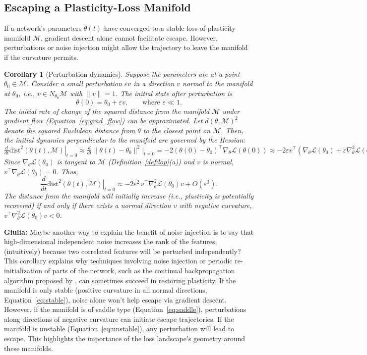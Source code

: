 \documentclass{article}
\newcommand{\Loss}{\mathcal{L}}
\newcommand{\giulia}[1]{{\color{ForestGreen}\textbf{Giulia:} #1}}
\newtheorem{corollary}{Corollary}[section]
\begin{document}
\subsection{Escaping a Plasticity-Loss Manifold}

If a network's parameters $\theta(t)$ have converged to a stable loss-of-plasticity manifold $\mathcal{M}$, gradient descent alone cannot facilitate escape. However, perturbations or noise injection might allow the trajectory to leave the manifold if the curvature permits.

\begin{corollary}[Perturbation dynamics]
\label{cor:perturb}
Suppose the parameters are at a point $\theta_0 \in \mathcal{M}$. Consider a small perturbation $\varepsilon v$ in a direction $v$ normal to the manifold at $\theta_0$, i.e., $v \in N_{\theta_0}\mathcal{M}$ with $\|v\|=1$. The initial state after perturbation is
\[
\theta(0)=\theta_0+\varepsilon v,\qquad \text{where } \varepsilon \ll 1.
\]
The initial rate of change of the squared distance from the manifold $\mathcal{M}$ under gradient flow (Equation~\ref{eq:grad_flow}) can be approximated. Let $d(\theta, \mathcal{M})^2$ denote the squared Euclidean distance from $\theta$ to the closest point on $\mathcal{M}$. Then, the initial dynamics perpendicular to the manifold are governed by the Hessian:
\(
\frac{d}{dt}\left.\mathrm{dist}^2(\theta(t),\mathcal{M})\right|_{t=0} \approx \frac{d}{dt} \|\theta(t) - \theta_0\|^2 \Big|_{t=0} = -2 (\theta(0)-\theta_0)^\top \nabla_\theta \Loss(\theta(0)) \approx -2 \varepsilon v^\top (\nabla_\theta \Loss(\theta_0) + \varepsilon \nabla_\theta^2 \Loss(\theta_0) v)
\)
Since $\nabla_\theta \Loss(\theta_0)$ is tangent to $\mathcal{M}$ (Definition~\ref{def:lop}(a)) and $v$ is normal, $v^\top \nabla_\theta \Loss(\theta_0) = 0$. Thus,
\[
\frac{d}{dt}\left.\mathrm{dist}^2(\theta(t),\mathcal{M})\right|_{t=0} \approx -2\varepsilon^2\,v^\top\nabla_\theta^2\Loss(\theta_0)v + O(\varepsilon^3).
\]
The distance from the manifold will initially increase (i.e., plasticity is potentially recovered) if and only if there exists a normal direction $v$ with negative curvature, $v^\top\nabla_\theta^2\Loss(\theta_0)v < 0$.
\end{corollary}

\giulia{Maybe another way to explain the benefit of noise injection is to say that high-dimensional independent noise increases the rank of the features, (intuitively) because two correlated features will be perturbed independently?}
This corollary explains why techniques involving noise injection or periodic re-initialization of parts of the network, such as the continual backpropagation algorithm proposed by \cite{dohare2024loss} , can sometimes succeed in restoring plasticity. If the manifold is only stable (positive curvature in all normal directions, Equation~\ref{eq:stable}), noise alone won't help escape via gradient descent. However, if the manifold is of saddle type (Equation~\ref{eq:saddle}), perturbations along directions of negative curvature can initiate escape trajectories. If the manifold is unstable (Equation~\ref{eq:unstable}), any perturbation will lead to escape. This highlights the importance of the loss landscape's geometry around these manifolds.
\end{document}
